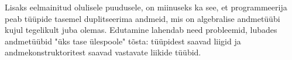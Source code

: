 \documentclass[12pt]{article}
\begin{document}
      Lisaks eelmainitud olulisele puudusele, on miinuseks ka see, et programmeerija peab tüüpide tasemel duplitseerima andmeid, mis on algebralise andmetüübi kujul tegelikult juba olemas. Edutamine lahendab need probleemid, lubades andmetüübid "üks tase ülespoole" tõsta: tüüpidest saavad liigid ja andmekonstruktoritest saavad vastavate liikide tüübid.
\begin{comment}
    Unfortunately, this would typecheck. And it most certainly should \textit{not}, because the programmer's intention was to create a type constructor that takes a type-level natural number as an argument.
  \end{frame}
  \begin{frame}[fragile]{Promotion}
    The solution is a more expressive kind system. \textit{Promotion} automatically makes new kinds and types from algebraic data types. Everything moves up one level.
    \begin{itemize}
      \item
        Type constructor -> Kind constructor
      \item
        Type parameter (of kind \verb!*!) -> Kind parameter
      \item
        Data constructor -> Type constructor
      \item
        Data constructor argument type -> Type constructor argument kind
    \end{itemize}
  \end{frame}
  \begin{frame}[fragile]{An Example of Promotion}
    \begin{kood}{Lists}
      \begin{verbatim}
data Lst (t :: *) = LNil | LCons t (Lst t)\end{verbatim}
    \end{kood}
    \begin{itemize}
      \item
        Data constructors:
        \begin{itemize}
          \item
            {\color{blue}\verb!LNil :: Lst (t :: *)!}
          \item
            {\color{blue}\verb!LCons :: (t :: *) -> Lst t -> Lst t!}
        \end{itemize}
      \item
        Type constructors:
        \begin{itemize}
          \item
            {\color{blue}\verb!Lst :: * -> *!}

\end{comment}
\end{document}
